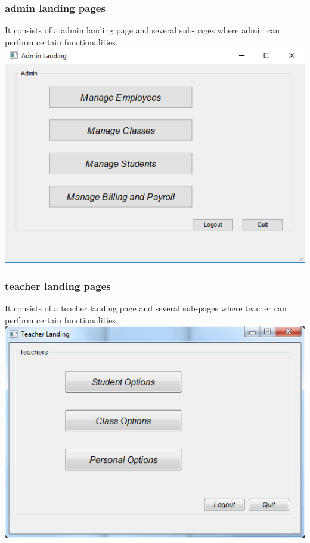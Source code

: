 \subsubsection{admin landing pages} 
It consists of a admin landing page and several sub-pages where admin can perform certain functionalities.\\
\includegraphics[scale=0.7]{pics/admin_landing.png}

\subsubsection{teacher landing pages} 
It consists of a teacher landing page and several sub-pages where teacher can perform certain functionalities.\\
\includegraphics[scale=0.7]{pics/teacher_landing.png}

